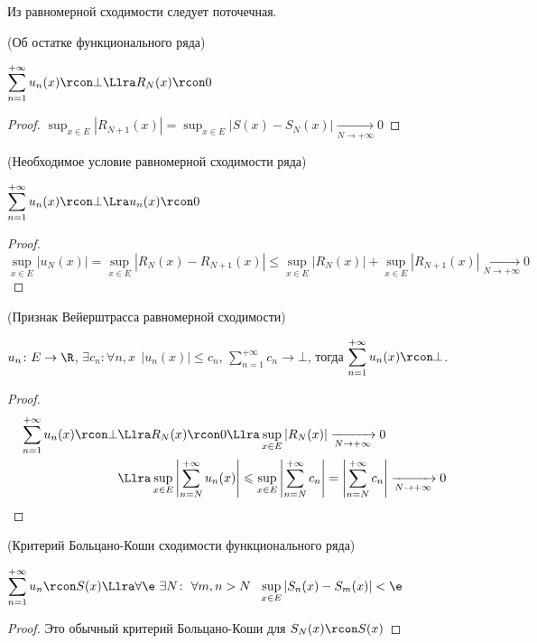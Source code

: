 \begin{remark}
    Из равномерной сходимости следует поточечная.
\end{remark}

\begin{lemma}(Об остатке функционального ряда)

    $\displaystyle \sum_{n = 1}^{+\infty}{u_n(x)} \rcon \bot \Llra R_N(x) \rcon 0$
\end{lemma}
\begin{proof}
$\displaystyle
    \sup_{x \in E}{|R_{N + 1}(x)|} = \sup_{x \in E}{|S(x) -
    S_N(x)|} \xrightarrow[N \to +\infty]{} 0
$
\end{proof}

\begin{lemma}(Необходимое условие равномерной сходимости ряда)

    $\displaystyle \sum_{n = 1}^{+\infty}{u_n(x)} \rcon \bot \Lra u_n(x) \rcon
    0$
\end{lemma}
\begin{proof}
\[
    \sup_{x \in E}{|u_N(x)|} = \sup_{x \in E}{| R_N(x) - R_{N + 1}(x)|}
    \leqslant \sup_{x \in E}{|R_N(x)|} + \sup_{x \in E}{|R_{N + 1}(x)|}
    \xrightarrow[N \to +\infty]{} 0
\]
\end{proof}

\begin{theorem}(Признак Вейерштрасса равномерной сходимости)

    $u_n \colon E \to \R$, $\exists c_n \colon \forall n, x~~ |u_n(x)|
    \leqslant c_n$, $\displaystyle \sum_{n = 1}^{+\infty}{c_n} \to \bot$,
    тогда $\displaystyle \sum_{n = 1}^{+\infty}{u_n(x)} \rcon \bot$.
\end{theorem}
\begin{proof}
\begin{align*}
    \sum_{n = 1}^{+\infty}{u_n(x)} \rcon \bot &\Llra
    R_N(x) \rcon 0 \Llra \sup_{x \in E}{|R_N(x)|} \xrightarrow[N \to +\infty]{}
    0 \\
    &\Llra \sup_{x \in E}{\left| \sum_{n = N}^{+\infty}{u_n(x)} \right|}
    \leqslant \sup_{x \in E}{\left| \sum_{n = N}^{+\infty}{c_n} \right|}
    = \left|\sum_{n = N}^{+\infty}{c_n}\right| \xrightarrow[N \to +\infty]{} 0
\end{align*}
\end{proof}

\begin{theorem}(Критерий Больцано-Коши сходимости функционального ряда)

    $\displaystyle \sum_{n = 1}^{+\infty}{u_n} \rcon S(x) \Llra
    \forall \e~ \exists N \colon~ \forall m, n > N~~ \sup_{x \in E}{|S_n(x) -
    S_m(x)|} < \e$
\end{theorem}
\begin{proof}
    Это обычный критерий Больцано-Коши для $S_N(x) \rcon S(x)$
\end{proof}

